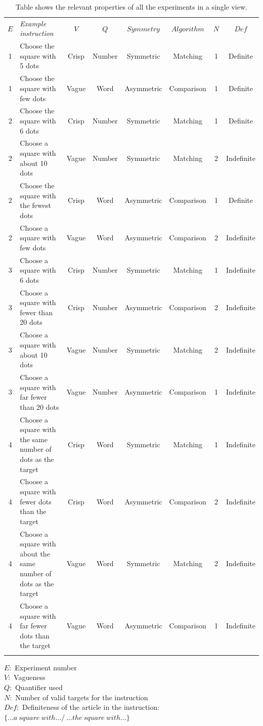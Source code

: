\begin{table}
\caption{Table shows the relevant properties of all the experiments in a single view.}
\label{AllInstructions} 
\begin{tabular}{clcccccc}
\hline\noalign{\smallskip}
$E$&\emph{Example instruction}&$V$&$Q$&$Symmetry$&$Algorithm$&$N$&$Def$\\
\noalign{\smallskip}\svhline\noalign{\smallskip}
   1&Choose the square with 5 dots&Crisp&Number&Symmetric&Matching&1&Definite\\
    1&Choose the square with few dots&Vague&Word&Asymmetric&Comparison&1&Definite\\
    2&Choose the square with 6 dots&Crisp&Number&Symmetric&Matching&1&Definite\\
    2&Choose a square with about 10 dots&Vague&Number&Symmetric&Matching&2&Indefinite\\
    2&Choose the square with the fewest dots&Crisp&Word&Asymmetric&Comparison&1&Definite\\
    2&Choose a square with few dots&Vague&Word&Asymmetric&Comparison&2&Indefinite\\
    3&Choose a square with 6 dots&Crisp&Number&Symmetric&Matching&1&Indefinite\\
    3&Choose a square with fewer than 20 dots&Crisp&Number&Asymmetric&Comparison&2&Indefinite\\
    3&Choose a square with about 10 dots&Vague&Number&Symmetric&Matching&2&Indefinite\\
    3&Choose a square with far fewer than 20 dots&Vague&Number&Asymmetric&Comparison&1&Indefinite\\
    4&Choose a square with the same number of dots as the target&Crisp&Word&Symmetric&Matching&1&Indefinite\\
    4&Choose a square with fewer dots than the target&Crisp&Word&Asymmetric&Comparison&2&Indefinite\\
    4&Choose a square with about the same number of dots as the target&Vague&Word&Symmetric&Matching&2&Indefinite\\
    4&Choose a square with far fewer dots than the target&Vague&Word&Asymmetric&Comparison&1&Indefinite\\
\noalign{\smallskip}\hline\noalign{\smallskip}
\end{tabular}
  $E$:~Experiment number\\
   $V$:~Vagueness\\
    $Q$:~Quantifier used\\
     $N$:~Number of valid targets for the instruction\\
     $Def$:~Definiteness of the article in the instruction: $\{\ldots a~square~with\ldots/~\ldots the~square~with\ldots \}$\\
\end{table}


%



